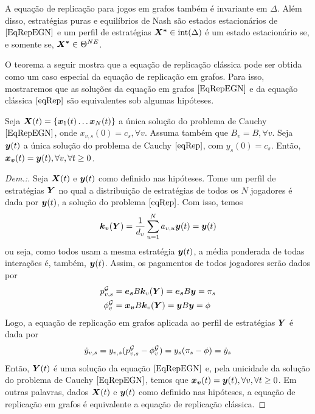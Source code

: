 A equação de replicação para jogos em grafos também é invariante em $\Delta$. Além disso, estratégias puras e equilíbrios de Nash são estados estacionários de $\eqref{EqRepEGN}$ e um perfil de estratégias $\boldsymbol{X^*}\in\text{int}(\Delta)$ é um estado estacionário se, e somente se, $\boldsymbol{X^*}\in\Theta^{NE}$.

O teorema a seguir mostra que a equação de replicação clássica pode ser obtida como um caso especial da equação de replicação em grafos. Para isso, mostraremos que as soluções da equação em grafos $\eqref{EqRepEGN}$ e da equação clássica $\eqref{eqRep}$ são equivalentes sob algumas hipóteses.

\begin{theorem}
    \label{TeoEquivalenciaEGN}
    Seja $\boldsymbol{X}(t)=\{\boldsymbol{x}_1(t)\dots\boldsymbol{x}_N(t)\}$ a única solução do problema de Cauchy $\eqref{EqRepEGN}$, onde $x_{v,s}(0)=c_s, \forall v$. Assuma também que $B_v=B, \forall v$. Seja $\boldsymbol{y}(t)$ a única solução do problema de Cauchy $\eqref{eqRep}$, com $y_s(0) = c_s$. Então, $\boldsymbol{x_v}(t)=\boldsymbol{y}(t), \forall v, \forall t\geq 0$.
\end{theorem}
\begin{proof}[Dem.:]
    Seja $\boldsymbol{X}(t)$ e $\boldsymbol{y}(t)$ como definido nas hipóteses. Tome um perfil de estratégias $\boldsymbol{Y}$ no qual a distribuição de estratégias de todos os $N$ jogadores é dada por $\boldsymbol{y}(t)$, a solução do problema $\eqref{eqRep}$. Com isso, temos
    \begin{equation*}
        \boldsymbol{k_v}(\boldsymbol{Y})=\frac{1}{d_v}\sum^N_{u=1}a_{v,u}\boldsymbol{y}(t)=\boldsymbol{y}(t)
    \end{equation*}
    ou seja, como todos usam a mesma estratégia $\boldsymbol{y}(t)$, a média ponderada de todas interações é, também, $\boldsymbol{y}(t)$. Assim, os pagamentos de todos jogadores serão dados por
    \begin{equation*}
    \begin{split}
        p^{\mathcal{G}}_{v,s}&=\boldsymbol{e_s}B\boldsymbol{k}_v(\boldsymbol{Y})=\boldsymbol{e_s}B\boldsymbol{y}=\pi_s\\
        \phi^{\mathcal{G}}_{v}&=\boldsymbol{x_v}B\boldsymbol{k}_v(\boldsymbol{Y})=\boldsymbol{y}B\boldsymbol{y}=\phi
    \end{split}
    \end{equation*}
    Logo, a equação de replicação em grafos aplicada ao perfil de estratégias $\boldsymbol{Y}$ é dada por
    \begin{equation*}
        \dot{y}_{v,s}=y_{v,s}(p^{\mathcal{G}}_{v,s}-\phi^{\mathcal{G}}_v)=y_s(\pi_s-\phi)=\dot{y}_s
    \end{equation*}
    Então, $\boldsymbol{Y}(t)$ é uma solução da equação $\eqref{EqRepEGN}$ e, pela unicidade da solução do problema de Cauchy $\eqref{EqRepEGN}$, temos que $\boldsymbol{x_v}(t)=\boldsymbol{y}(t),\forall v,\forall t\geq 0$. Em outras palavras, dados $\boldsymbol{X}(t)$ e $\boldsymbol{y}(t)$ como definido nas hipóteses, a equação de replicação em grafos é equivalente a equação de replicação clássica.
\end{proof}
